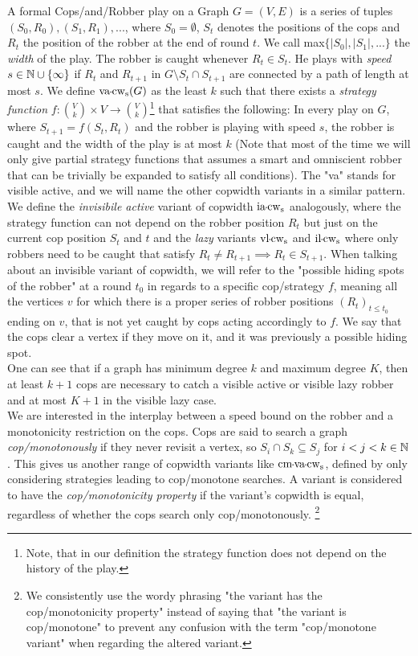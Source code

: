 A formal Cops\-/and\-/Robber play on a Graph $G=(V, E)$ is a series of tuples $(S_0, R_0), (S_1, R_1), ...$, where $S_0=\emptyset$, $S_t$ denotes the positions of the cops and $R_t$ the position of the robber at the end of round $t$. We call max$\{|S_0|, |S_1|,...\}$ the \emph{width} of the play. The robber is caught whenever $R_t \in S_t$. He plays with \emph{speed} $s\in \mathbb{N} \cup \{\infty\}$ if $R_t$ and $R_{t+1}$ in $G\setminus {S_t \cap S_{t+1}}$ are connected by a path of length at most $s$. We define \emph{$\vacopwidth{s}(G)$} as the least $k$ such that there exists a \emph{strategy function} $f:\binom{V}{k} \times V \rightarrow \binom{V}{k}$\footnote{Note, that in our definition the strategy function does not depend on the history of the play.} that satisfies the following: In every play on $G$, where $S_{t+1}=f(S_t, R_t)$ and the robber is playing with speed $s$, the robber is caught and the width of the play is at most $k$ (Note that most of the time we will only give partial strategy functions that assumes a smart and omniscient robber that can be trivially be expanded to satisfy all conditions). The "va" stands for visible active, and we will name the other copwidth variants in a similar pattern. We define the \emph{invisibile active} variant of copwidth $\iacopwidth{s}$ analogously, where the strategy function can not depend on the robber position $R_t$ but just on the current cop position $S_t$ and $t$ and the \emph{lazy} variants $\vlcopwidth{s}$ and $\ilcopwidth{s}$ where only robbers need to be caught that satisfy $R_t \neq R_{t+1} \implies R_t \in S_{t+1}$. When talking about an invisible variant of copwidth, we will refer to the "possible hiding spots of the robber" at a round $t_0$ in regards to a specific cop\-/strategy $f$, meaning all the vertices $v$ for which there is a proper series of robber positions $(R_t)_{t\leq t_0}$ ending on $v$, that is not yet caught by cops acting accordingly to $f$. We say that the cops clear a vertex if they move on it, and it was previously a possible hiding spot.\\
One can see that if a graph has minimum degree $k$ and maximum degree $K$, then at least $k+1$ cops are necessary to catch a visible active or visible lazy robber and at most $K+1$ in the visible lazy case. \\ %
We are interested in the interplay between a speed bound on the robber and a monotonicity restriction on the cops. Cops are said to search a graph \emph{cop\-/monotonously} if they never revisit a vertex, so $S_i \cap S_k \subseteq S_j$ for $i<j<k \in \mathbb{N}$. This gives us another range of copwidth variants like $\cmvacopwidth{s}$, defined by only considering strategies leading to cop\-/monotone searches. A variant is considered to have the \emph{cop\-/monotonicity property} if the variant's copwidth is equal, regardless of whether the cops search only cop\-/monotonously. \footnote{We consistently use the wordy phrasing "the variant has the cop\-/monotonicity property" instead of saying that "the variant is cop\-/monotone" to prevent any confusion with the term "cop\-/monotone variant" when regarding the altered variant.} \\
